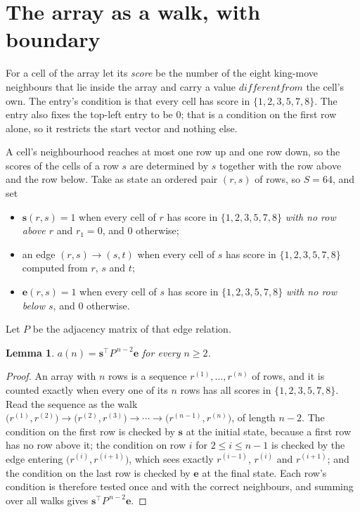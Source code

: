\documentclass[11pt,a4paper]{article}
\theoremstyle{plain}
\newtheorem{lemma}[theorem]{Lemma}
\theoremstyle{definition}
\begin{document}
\section{The array as a walk, with boundary}

For a cell of the array let its \emph{score} be the number of the eight king-move neighbours that lie inside
the array and carry a value $different from$ the cell's own. The entry's condition is that every cell
has score in $\{1,2,3,5,7,8\}$. The entry also fixes the top-left entry to be $0$; that is a condition on the first row alone, so it restricts the start vector and nothing else.

A cell's neighbourhood reaches at most one row up and one row down, so the scores of the
cells of a row $s$ are determined by $s$ together with the row above and the row below.
Take as state an ordered pair $(r,s)$ of rows, so $S=64$, and set
\begin{itemize}
\item $\mathbf{s}(r,s)=1$ when every cell of $r$ has score in $\{1,2,3,5,7,8\}$ \emph{with no row
above $r$} and $r_1=0$, and $0$ otherwise;
\item an edge $(r,s)\to(s,t)$ when every cell of $s$ has score in $\{1,2,3,5,7,8\}$ computed from
$r$, $s$ and $t$;
\item $\mathbf{e}(r,s)=1$ when every cell of $s$ has score in $\{1,2,3,5,7,8\}$ \emph{with no row
below $s$}, and $0$ otherwise.
\end{itemize}
Let $P$ be the adjacency matrix of that edge relation.

\begin{lemma}\label{lem:walk}
$a(n)=\mathbf{s}^{\!\top}P^{\,n-2}\mathbf{e}$ for every $n\ge2$.
\end{lemma}

\begin{proof}
An array with $n$ rows is a sequence $r^{(1)},\dots,r^{(n)}$ of rows, and it is counted
exactly when every one of its $n$ rows has all scores in $\{1,2,3,5,7,8\}$. Read the sequence as the
walk $\bigl(r^{(1)},r^{(2)}\bigr)\to\bigl(r^{(2)},r^{(3)}\bigr)\to\cdots\to
\bigl(r^{(n-1)},r^{(n)}\bigr)$, of length $n-2$. The condition on the first row is
checked by $\mathbf{s}$ at the initial state, because a first row has no row above it; the
condition on row $i$ for $2\le i\le n-1$ is checked by the edge entering
$\bigl(r^{(i)},r^{(i+1)}\bigr)$, which sees exactly $r^{(i-1)}$, $r^{(i)}$ and
$r^{(i+1)}$; and the condition on the last row is checked by $\mathbf{e}$ at the final
state. Each row's condition is therefore tested once and with the correct neighbours, and
summing over all walks gives $\mathbf{s}^{\!\top}P^{\,n-2}\mathbf{e}$.
\end{proof}
\end{document}

